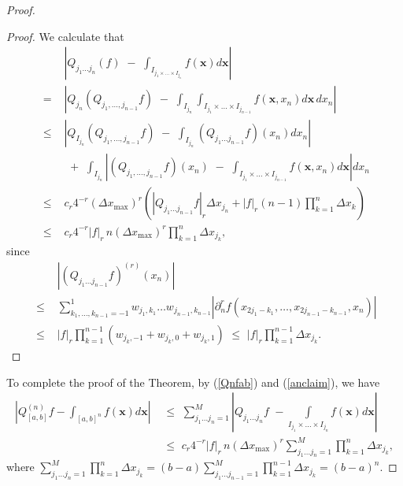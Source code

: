 \documentclass[10pt,a4paper]{amsart}
\begin{document}
\begin{proof}
\begin{proof} 
We calculate that 
\begin{align} 
&\left| Q_{j_1 \dots j_n}(f) \,\,-\,\, \int_{I_{j_1 \times \dots \times I_{j_n}}}   f(\mathbf{x}) d\mathbf{x}  \right| 
 \nonumber
\\
\,\,=\,\,& \left| 
Q_{j_n}(Q_{j_1,\dots,j_{n-1}} f) \,\,-\,\,  \int_{I_{j_n}}\int_{I_{j_1} \times \dots \times I_{j_{n-1}}}  f(\mathbf{x}, x_n) d\mathbf{x} \,dx_n  \right|
 \nonumber
\\
\,\,\leq\,\, & \left| Q_{I_{j_n}} (Q_{j_1,\dots,j_{n-1}} f) \,\,-\,\, \int_{I_{j_n}} (Q_{j_1 \dots j_{n-1}} f)(x_n) dx_n  \right|
 \nonumber 
\\
&\,\,+\,\,   \int_{I_{j_n}} \left| (Q_{j_1,\dots,j_{n-1}} f)(x_n)\,\, -\,\, 
\int_{I_{j_1} \times \dots \times I_{j_{n-1}}}  f(\mathbf{x}, x_n) d\mathbf{x}  \right| dx_n
 \nonumber 
\\  
\,\,\leq\,\, & c_r 4^{-r} (\Delta x_{\operatorname{max}})^{r}  
\left( | Q_{j_1 \dots j_{n-1}} f |_r \Delta x_{j_n}  
+  |f|_r (n-1)     \prod\limits_{k=1}^{n} \Delta x_k   \right)
\nonumber 
\\
\,\,\leq\,\,&   c_r 4^{-r}|f|_r \,n     (\Delta x_{\operatorname{max}})^{r}  
     \prod\limits_{k=1}^n \Delta x_{j_k},
     \nonumber
 \end{align}
since 
\begin{align}
&\left| (Q_{j_1 \dots j_{n-1}} f)^{(r)}(x_n) \right| 
\nonumber
\\
\,\,\leq\,\,&
\sum_{k_1,\dots,k_{n-1} = -1}^1 \!\!\!\!\! \!\!\! w_{j_1,k_1} \dots w_{j_{n-1},k_{n-1}} \left| \partial_n^r f(x_{2j_1 - k_1}, \dots, x_{2j_{n-1} - k_{n-1}}, x_n) \right|
\nonumber 
\\ 
\,\,\leq\,\,&  |f|_r  \prod\limits_{k=1}^{n-1}(w_{j_k,-1} + w_{j_k,0} + w_{j_k,1})
\,\,\leq\,\,  |f|_r  \prod\limits_{k=1}^{n-1} \Delta x_{j_k}.
\nonumber
\end{align}
\end{proof}
To complete the proof of the Theorem, by (\ref{Qnfab}) and (\ref{anclaim}), we have
\begin{align}
\left | Q_{[a,b]}^{(n)}f  - \int_{[a,b]^n}  f(\mathbf{x}) d\mathbf{x} \right|
&\,\,\leq\,\, 
\sum\limits_{j_1 \dots j_n = 1}^M \left| 
Q_{j_1 \dots j_n} f  \,\,- 
\int\limits_{I_{j_1}\times \dots \times I_{j_n}} f(\mathbf{x}) d\mathbf{x} 
\right|
\nonumber
\\
&\,\,\leq\,\, 
c_r 4^{-r}|f|_r \,n     (\Delta x_{\operatorname{max}})^{r}  
   \sum\limits_{j_1 \dots j_n = 1}^M   \prod\limits_{k=1}^n \Delta x_{j_k},
\end{align}
where
$ \sum\limits_{j_1 \dots j_n = 1}^M   \prod\limits_{k=1}^n \Delta x_{j_k} =
(b-a)  \sum\limits_{j_1 \dots j_{n-1} = 1}^M   \prod\limits_{k=1}^{n-1} \Delta x_{j_k}
= (b-a)^n$.
\end{proof}
\end{document}
